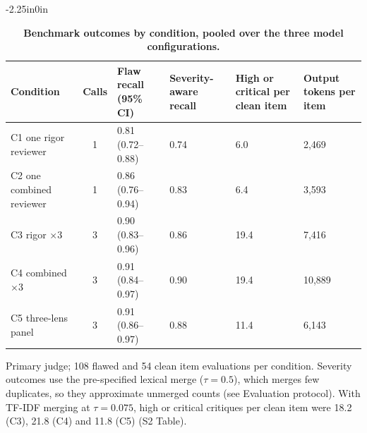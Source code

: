\begin{table}[!ht]
\begin{adjustwidth}{-2.25in}{0in}
\centering
\caption{{\bf Benchmark outcomes by condition, pooled over the three model configurations.}}
\label{table_benchmark}
\begin{tabular}{@{}p{3.3cm}cp{2.3cm}p{1.8cm}p{1.9cm}p{1.6cm}@{}}
\hline
\textbf{Condition} & \textbf{Calls} & \textbf{Flaw recall (95\% CI)} & \textbf{Severity-aware recall} & \textbf{High or critical per clean item} & \textbf{Output tokens per item} \\ \hline
C1 one rigor reviewer & 1 & 0.81 (0.72--0.88) & 0.74 & 6.0 & 2,469 \\
C2 one combined reviewer & 1 & 0.86 (0.76--0.94) & 0.83 & 6.4 & 3,593 \\
C3 rigor $\times$3 & 3 & 0.90 (0.83--0.96) & 0.86 & 19.4 & 7,416 \\
C4 combined $\times$3 & 3 & 0.91 (0.84--0.97) & 0.90 & 19.4 & 10,889 \\
C5 three-lens panel & 3 & 0.91 (0.86--0.97) & 0.88 & 11.4 & 6,143 \\ \hline
\end{tabular}
\begin{flushleft} Primary judge; 108 flawed and 54 clean item evaluations per condition. Severity outcomes use the pre-specified lexical merge ($\tau=0.5$), which merges few duplicates, so they approximate unmerged counts (see Evaluation protocol). With TF-IDF merging at $\tau=0.075$, high or critical critiques per clean item were 18.2 (C3), 21.8 (C4) and 11.8 (C5) (S2 Table).
\end{flushleft}
\end{adjustwidth}
\end{table}
